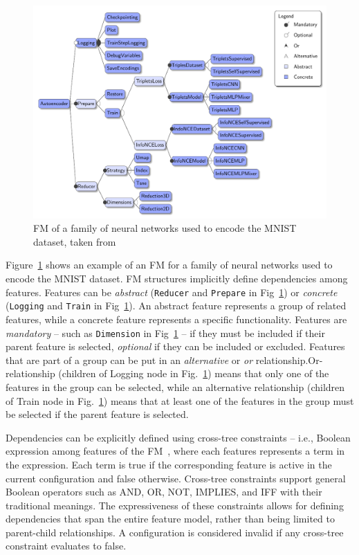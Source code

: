 \begin{figure}[t]
    \centering
    \includegraphics[width=0.9\linewidth]{figs/background/mnist_featuremodel.pdf}
    \caption{FM of a family of neural networks used to encode the MNIST dataset, taken from \cite{Cazzola22c}}
    \label{lst:background:featuremodel}
\end{figure}

Figure~\ref{lst:background:featuremodel} shows an example of an FM for a family of neural networks used to encode the MNIST dataset.
FM structures implicitly define dependencies among features. Features can be \textit{abstract} (\texttt{Reducer} and \texttt{Prepare} in Fig~\ref{lst:background:featuremodel}) or \textit{concrete} (\texttt{Logging} and \texttt{Train} in Fig~\ref{lst:background:featuremodel}).
An abstract feature represents a group of related features, while a concrete feature represents a specific functionality.
Features are \textit{mandatory} -- such as \texttt{Dimension} in Fig~\ref{lst:background:featuremodel} -- if they must be included if their parent feature is selected, \textit{optional} if they can be included or excluded.
Features that are part of a group can be put in an \textit{alternative} or \textit{or} relationship.Or-relationship (children of Logging node in Fig.~\ref{lst:background:featuremodel}) means that only one of the features in the group can be selected, while an alternative relationship (children of Train node in Fig.~\ref{lst:background:featuremodel}) means that at least one of the features in the group must be selected if the parent feature is selected.

Dependencies can be explicitly defined using cross-tree constraints -- i.e., Boolean expression among features of the FM~\cite{Cazzola22c}, where each features represents a term in the expression. Each term is true if the corresponding feature is active in the current configuration and false otherwise. Cross-tree constraints support general Boolean operators such as AND, OR, NOT, IMPLIES, and IFF with their traditional meanings.
The expressiveness of these constraints allows for defining dependencies that span the entire feature model, rather than being limited to parent-child relationships. A configuration is considered invalid if any cross-tree constraint evaluates to false.


